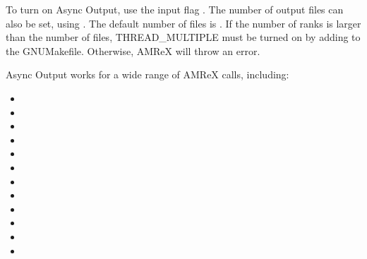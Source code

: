 \documentclass[letterpaper,10pt,english]{sphinxmanual}
\begin{document}
\sphinxAtStartPar
To turn on Async Output, use the input flag .  The number
of output files can also be set, using .  The default
number of files is . If the number of ranks is larger than the number of
files, THREAD\_MULTIPLE must be turned on by adding
 to the GNUMakefile. Otherwise, AMReX
will throw an error.

\sphinxAtStartPar
Async Output works for a wide range of AMReX calls, including:
\begin{itemize}
\item {} 
\sphinxAtStartPar
{}

\item {} 
\sphinxAtStartPar
{}

\item {} 
\sphinxAtStartPar
{}

\item {} 
\sphinxAtStartPar
{}

\item {} 
\sphinxAtStartPar
{}

\item {} 
\sphinxAtStartPar
{}

\item {} 
\sphinxAtStartPar
{}

\item {} 
\sphinxAtStartPar
{}

\item {} 
\sphinxAtStartPar
{}

\item {} 
\sphinxAtStartPar
{}

\item {} 
\sphinxAtStartPar
{}

\item {} 
\sphinxAtStartPar
{}

\end{itemize}
\end{document}
